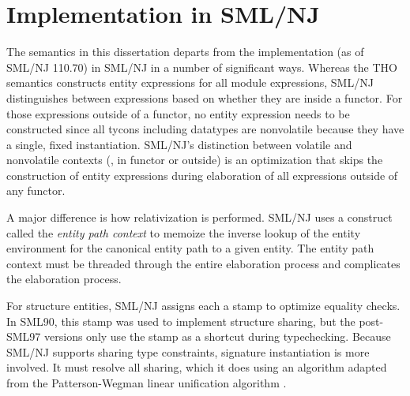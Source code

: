 
\chapter{Implementation in SML/NJ}\label{ch:impl}

The semantics in this dissertation departs from the implementation (as
of SML/NJ 110.70) in
SML/NJ in a number of significant ways. Whereas the THO semantics
constructs entity expressions for all module expressions, SML/NJ
distinguishes between expressions based on whether they are inside a
functor. For those expressions outside of a functor, no entity
expression needs to be constructed since all tycons including
datatypes are nonvolatile because they have a single, fixed
instantiation. SML/NJ's distinction between volatile and nonvolatile
contexts (\ie, in functor or outside) is an optimization that skips
the construction of entity expressions during elaboration of all
expressions outside of any functor. 

A major difference is how relativization is performed. SML/NJ uses a
construct called the \emph{entity path context} to memoize the inverse
lookup of the entity environment for the canonical entity path to a
given entity. The entity path context must be threaded through the
entire elaboration process and complicates the elaboration process. 
 
For structure entities, SML/NJ assigns each a stamp to optimize
equality checks. In SML90, this stamp was used to implement structure
sharing, but the post-SML97 versions only use the stamp as a shortcut
during typechecking. Because SML/NJ supports sharing type constraints, signature
instantiation is more involved. It must resolve all sharing, which it
does using an algorithm adapted from the Patterson-Wegman linear unification algorithm \cite{PattersonWegman}.


